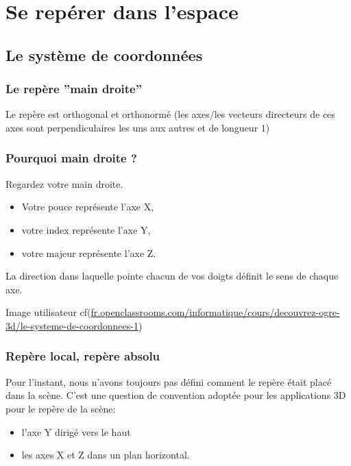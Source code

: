 \chapter{Se rep\'erer dans l'espace}


\section{Le syst\`eme de coordonn\'ees}


\subsection{Le rep\`ere ''main droite''}

Le rep\`ere est orthogonal et orthonorm\'e (les axes/les vecteurs directeurs de ces axes sont perpendiculaires les uns aux autres et de longueur 1)



\subsection{Pourquoi main droite ?}

Regardez votre main droite.
\begin{itemize} 
\item Votre pouce repr\'esente l'axe X, 
\item votre index repr\'esente l'axe Y,
\item votre majeur repr\'esente l'axe Z. 
\end{itemize}

La direction dans laquelle pointe chacun de vos doigts d\'efinit le sens de chaque axe.

Image utilisateur cf(\url{fr.openclassrooms.com/informatique/cours/decouvrez-ogre-3d/le-systeme-de-coordonnees-1})





\subsection{Rep\`ere local, rep\`ere absolu}

Pour l'instant, nous n'avons toujours pas d\'efini comment le rep\`ere \'etait plac\'e dans la sc\`ene. C'est une question de convention adopt\'ee pour les applications 3D	pour le rep\`ere de la sc\`ene:
\begin{itemize}
\item l'axe Y dirig\'e vers le haut 
\item les axes X et Z dans un plan horizontal.
\end{itemize}

